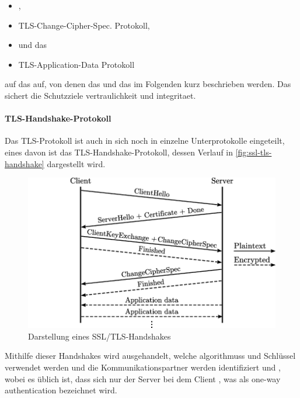 \begin{itemize}
    \item {}, 
    \item \ac{TLS}-Change-Cipher-Spec. Protokoll, 
    \item {} und das 
    \item \ac{TLS}-Application-Data Protokoll
\end{itemize}
auf das  auf\autocite[\vglf][]{Transpor18:online}, von denen das  und das  im Folgenden kurz beschrieben werden.
Das  sichert die Schutzziele \gls{vertraulichkeit} und \gls{integritaet}.\autocite[\vglf][]{Transpor18:online}

\paragraph[TLS-Handshake-Protokoll]{\ac{TLS}-Handshake-Protokoll}\label{par:tls_handshake_protocol}
Das \ac{TLS}-Protokoll ist auch in sich noch in einzelne Unterprotokolle eingeteilt, eines davon ist das \ac{TLS}-Handshake-Protokoll, dessen Verlauf in \autoref{fig:ssl-tls-handshake}\autocite[Aus][]{SslTlsFingerprint:2015} dargestellt wird.

\begin{figure}[htpb]
    \centering
    \includegraphics[width=0.75\linewidth]{abbildungen/ssl-tls-handshake.png}
    \caption[Darstellung eines SSL/TLS-Handshakes]{Darstellung eines \ac{SSL}/\ac{TLS}-Handshakes\footnotemark}
    \label{fig:ssl-tls-handshake}
\end{figure}

Mithilfe dieser Handshakes wird ausgehandelt, welche  \glspl{algorithmus} und Schlüssel verwendet werden und die Kommunikationspartner werden identifiziert und , wobei es üblich ist, dass sich nur der Server bei dem Client , was als one-way authentication bezeichnet wird\autocite[\vglf][]{morrissey_tls_2010}.

